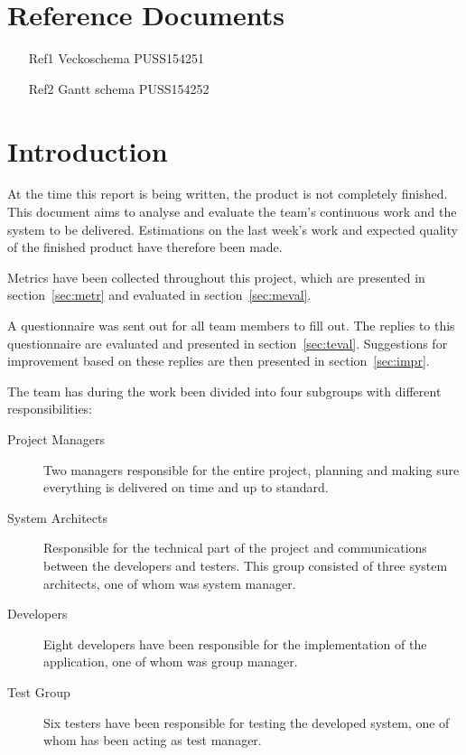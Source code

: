 \documentclass[a4paper]{article}
\begin{document}
\section{Reference Documents}
\begin{enumerate}

\item[Ref1] Veckoschema PUSS154251

\item[Ref2] Gantt schema PUSS154252 

\end{enumerate}


\section{Introduction}
At the time this report is being written, the product is not completely finished. This document aims to analyse and evaluate the team's continuous work and the system to be delivered. Estimations on the last week's work and expected quality of the finished product have therefore been made. 

Metrics have been collected throughout this project, which are presented in section~\ref{sec:metr} and evaluated in section~\ref{sec:meval}.

A questionnaire was sent out for all team members to fill out. The replies to this questionnaire are evaluated and presented in section~\ref{sec:teval}. Suggestions for improvement based on these replies are then presented in section~\ref{sec:impr}.

The team has during the work been divided into four subgroups with different responsibilities:

\begin{description}
\item[Project Managers] Two managers responsible for the entire project, planning and making sure everything is delivered on time and up to standard.
\item[System Architects] Responsible for the technical part of the project and communications between the developers and testers. This group consisted of three system architects, one of whom was system manager.
\item[Developers] Eight developers have been responsible for the implementation of the application, one of whom was group manager.
\item[Test Group] Six testers have been responsible for testing the developed system, one of whom has been acting as test manager.
\end{description}
\end{document}
